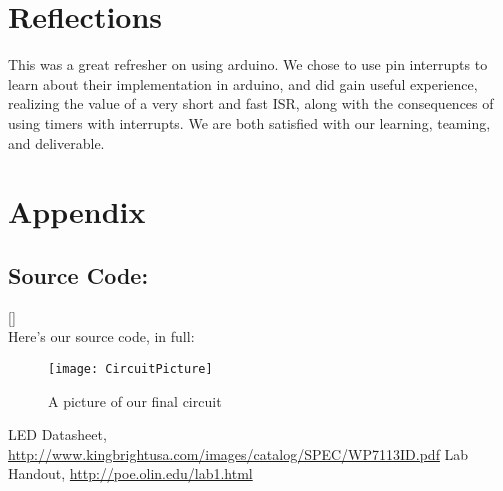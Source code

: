 \documentclass{article}
\begin{document}
\section{Reflections}
This was a great refresher on using arduino. We chose to use pin interrupts to learn about their implementation in arduino, and did gain useful experience, realizing the value of a very short and fast ISR, along with the consequences of using timers with interrupts.
We are both satisfied with our learning, teaming, and deliverable.

\section{Appendix}
\subsection{Source Code:}

\href{https://github.com/labseven/PoELab1}{[\color{blue}{View on Github}]} \\
Here's our source code, in full: \\



\begin{figure}[h]
    \centering
    \texttt{[image: CircuitPicture]}
    \caption{A picture of our final circuit}
    \label{fig:picture}
\end{figure}

\begin{thebibliography}{9}
    LED Datasheet,
    \url{http://www.kingbrightusa.com/images/catalog/SPEC/WP7113ID.pdf}
    Lab Handout,
    \url{http://poe.olin.edu/lab1.html}
\end{thebibliography}
\end{document}
